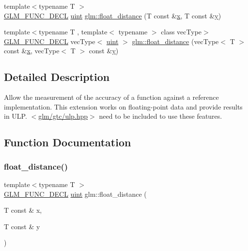\begin{DoxyCompactItemize}
\item 
{\footnotesize template$<$typename T $>$ }\\\mbox{\hyperlink{setup_8hpp_ab2d052de21a70539923e9bcbf6e83a51}{G\+L\+M\+\_\+\+F\+U\+N\+C\+\_\+\+D\+E\+CL}} \mbox{\hyperlink{group__core__precision_ga4fd29415871152bfb5abd588334147c8}{uint}} \mbox{\hyperlink{group__gtc__ulp_ga2e09bd6c8b0a9c91f6f5683d68245634}{glm\+::float\+\_\+distance}} (T const \&\mbox{\hyperlink{glad_8h_a92d0386e5c19fb81ea88c9f99644ab1d}{x}}, T const \&\mbox{\hyperlink{glad_8h_a66ddd433d2cacfe27f5906b7e86faeed}{y}})
\item 
{\footnotesize template$<$typename T , template$<$ typename $>$ class vec\+Type$>$ }\\\mbox{\hyperlink{setup_8hpp_ab2d052de21a70539923e9bcbf6e83a51}{G\+L\+M\+\_\+\+F\+U\+N\+C\+\_\+\+D\+E\+CL}} vec\+Type$<$ \mbox{\hyperlink{group__core__precision_ga4fd29415871152bfb5abd588334147c8}{uint}} $>$ \mbox{\hyperlink{group__gtc__ulp_ga85355f2549d75789eb66e5d565d8ad26}{glm\+::float\+\_\+distance}} (vec\+Type$<$ T $>$ const \&\mbox{\hyperlink{glad_8h_a92d0386e5c19fb81ea88c9f99644ab1d}{x}}, vec\+Type$<$ T $>$ const \&\mbox{\hyperlink{glad_8h_a66ddd433d2cacfe27f5906b7e86faeed}{y}})
\end{DoxyCompactItemize}


\subsection{Detailed Description}
Allow the measurement of the accuracy of a function against a reference implementation. This extension works on floating-\/point data and provide results in U\+LP. $<$\mbox{\hyperlink{ulp_8hpp}{glm/gtc/ulp.\+hpp}}$>$ need to be included to use these features. 



\subsection{Function Documentation}
\mbox{\label{group__gtc__ulp_ga2e09bd6c8b0a9c91f6f5683d68245634}} 
\subsubsection{\texorpdfstring{float\_distance()}{float\_distance()}\hspace{0.1cm}{\footnotesize\ttfamily [1/2]}}
{\footnotesize\ttfamily template$<$typename T $>$ \\
\mbox{\hyperlink{setup_8hpp_ab2d052de21a70539923e9bcbf6e83a51}{G\+L\+M\+\_\+\+F\+U\+N\+C\+\_\+\+D\+E\+CL}} \mbox{\hyperlink{group__core__precision_ga4fd29415871152bfb5abd588334147c8}{uint}} glm\+::float\+\_\+distance (\begin{DoxyParamCaption}\item[{T const \&}]{x,  }\item[{T const \&}]{y }\end{DoxyParamCaption})}

